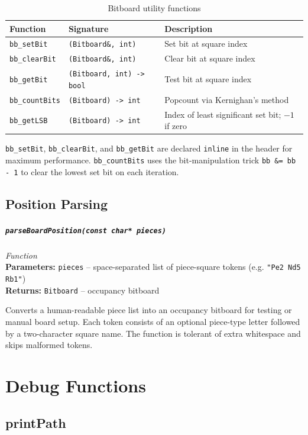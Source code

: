 \documentclass[11pt,a4paper]{report}
\newcommand{\function}[4]{%
    \paragraph{\texttt{#1}} \hfill \textit{#2}\\
    \textbf{Parameters:} #3\\
    \textbf{Returns:} #4
}
\begin{document}
\begin{table}[h]
\centering
\begin{tabular}{lll}
\toprule
\textbf{Function} & \textbf{Signature} & \textbf{Description} \\
\midrule
\texttt{bb\_setBit}   & \texttt{(Bitboard\&, int)} & Set bit at square index \\
\texttt{bb\_clearBit} & \texttt{(Bitboard\&, int)} & Clear bit at square index \\
\texttt{bb\_getBit}   & \texttt{(Bitboard, int) -> bool} & Test bit at square index \\
\texttt{bb\_countBits}& \texttt{(Bitboard) -> int} & Popcount via Kernighan's method \\
\texttt{bb\_getLSB}   & \texttt{(Bitboard) -> int} & Index of least significant set bit; $-1$ if zero \\
\bottomrule
\end{tabular}
\caption{Bitboard utility functions}
\end{table}

\texttt{bb\_setBit}, \texttt{bb\_clearBit}, and \texttt{bb\_getBit} are declared \texttt{inline} in the header for maximum performance. \texttt{bb\_countBits} uses the bit-manipulation trick \texttt{bb \&= bb - 1} to clear the lowest set bit on each iteration.

\section{Position Parsing}

\function{parseBoardPosition(const char* pieces)}{Function}{\texttt{pieces} -- space-separated list of piece-square tokens (e.g. \texttt{"Pe2 Nd5 Rb1"})}{\texttt{Bitboard} -- occupancy bitboard}

Converts a human-readable piece list into an occupancy bitboard for testing or manual board setup. Each token consists of an optional piece-type letter followed by a two-character square name. The function is tolerant of extra whitespace and skips malformed tokens.

\chapter{Debug Functions}

\section{printPath}
\end{document}
